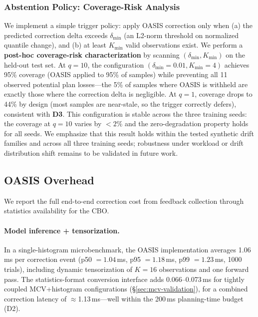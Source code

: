 \documentclass[runningheads]{llncs}
\begin{document}
\subsubsection{Abstention Policy: Coverage-Risk Analysis}
\label{sec:abstention}

We implement a simple trigger policy: apply OASIS correction only when (a) the predicted correction delta exceeds $\delta_{\min}$ (an L2-norm threshold on normalized quantile change), and (b) at least $K_{\min}$ valid observations exist. We perform a \textbf{post-hoc coverage-risk characterization} by scanning $(\delta_{\min}, K_{\min})$ on the held-out test set. At $q{=}10$, the configuration $(\delta_{\min}{=}0.01, K_{\min}{=}4)$ achieves 95\% coverage (OASIS applied to 95\% of samples) while preventing all 11 observed potential plan losses---the 5\% of samples where OASIS is withheld are exactly those where the correction delta is negligible. At $q{=}1$, coverage drops to 44\% by design (most samples are near-stale, so the trigger correctly defers), consistent with \textbf{D3}. This configuration is stable across the three training seeds: the coverage at $q{=}10$ varies by ${<}2\%$ and the zero-degradation property holds for all seeds. We emphasize that this result holds within the tested synthetic drift families and across all three training seeds; robustness under workload or drift distribution shift remains to be validated in future work.


\subsection{OASIS Overhead}
\label{sec:oasis-overhead}

We report the full end-to-end correction cost from feedback collection through statistics availability for the CBO.

\paragraph{Model inference + tensorization.}
In a single-histogram microbenchmark, the OASIS implementation averages 1.06\,ms per correction event (p50 ${=}1.04$\,ms, p95 ${=}1.18$\,ms, p99 ${=}1.23$\,ms, 1000 trials), including dynamic tensorization of $K{=}16$ observations and one forward pass. The statistics-format conversion interface adds 0.066--0.073\,ms for tightly coupled MCV+histogram configurations (\S\ref{sec:mcv-validation}), for a combined correction latency of $\approx$1.13\,ms---well within the 200\,ms planning-time budget (D2).
\end{document}
